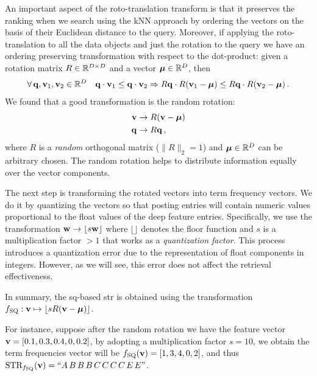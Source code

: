 An important aspect of the roto-translation transform is that it preserves the ranking when we search using the kNN approach by ordering the vectors on the basis of their Euclidean distance to the query.
Moreover, if applying the roto-translation to all the data objects and just the rotation to the query we have an ordering preserving transformation with respect to the dot-product: given a rotation matrix $R \in \mathbb{R}^{{D} \times {D}}$ and a vector $\boldsymbol {\mu} \in \mathbb{R}^{{D}}$, then
\begin{equation}
\forall\, \mathbf{q}, \mathbf{v}_1, \mathbf{v}_2 \in \mathbb{R}^{{D}} \quad	\mathbf{q} \cdot \mathbf{v}_1 \leq \mathbf{q} \cdot \mathbf{v}_2 \Rightarrow R\mathbf{q}\cdot R(\mathbf{v}_1 - \boldsymbol {\mu}) \leq R\mathbf{q}\cdot R(\mathbf{v}_2 - \boldsymbol {\mu}) \,.
\end{equation}
We found that a good transformation is the random rotation:
\begin{align}
\mathbf{v} &\to R(\mathbf{v} - \boldsymbol {\mu}) \\
\mathbf{q} &\to R \mathbf{q} \,,
\end{align}
where $R$ is a \emph{random} orthogonal matrix ($\|R\|_2 = 1$) and $\boldsymbol {\mu} \in \mathbb{R}^{{D}}$ can be arbitrary chosen.
The random rotation helps to distribute information equally over the vector components.

The next step is transforming the rotated vectors into term frequency vectors.
We do it by quantizing the vectors so that posting entries will contain numeric values proportional to the float values of the deep feature entries.
Specifically, we use the transformation $\mathbf{w} \to \lfloor s\mathbf{w} \rfloor$ where $\lfloor \rfloor$ denotes the floor function and $s$ is a multiplication factor $> 1$ that works as a \emph{quantization factor}.
This process introduces a quantization error due to the representation of float components in integers.
However, as we will see, this error does not affect the retrieval effectiveness.

In summary, the \gls{sq}-based \gls{str} is obtained using the transformation
$
f_\text{SQ} : \mathbf{v} \mapsto \lfloor s R(\mathbf{v} -\boldsymbol {\mu})\rfloor
$.

For instance, suppose after the random rotation we have the feature vector $\mathbf{v} = [0.1, 0.3, 0.4, 0, 0.2]$, by adopting a multiplication factor $s = 10$, we obtain the term frequencies vector will be $f_\text{SQ}(\mathbf{v}) = [1, 3, 4, 0, 2]$, and thus $\text{STR}_{f_\text{SQ}}(\mathbf{v})=``A\, B\, B\, B \, C \, C\, C\, C\, E\, E"$.

